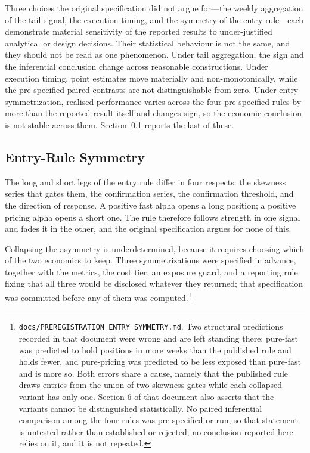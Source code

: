 \documentclass[11pt]{article}
\begin{document}
Three choices the original specification did not argue for---the weekly aggregation of the tail signal, the execution timing, and the symmetry of the entry rule---each demonstrate material sensitivity of the reported results to under-justified analytical or design decisions. Their statistical behaviour is not the same, and they should not be read as one phenomenon. Under tail aggregation, the sign and the inferential conclusion change across reasonable constructions. Under execution timing, point estimates move materially and non-monotonically, while the pre-specified paired contrasts are not distinguishable from zero. Under entry symmetrization, realised performance varies across the four pre-specified rules by more than the reported result itself and changes sign, so the economic conclusion is not stable across them. Section~\ref{sec:entrysymmetry} reports the last of these.

\subsection{Entry-Rule Symmetry}
\label{sec:entrysymmetry}

The long and short legs of the entry rule differ in four respects: the skewness series that gates them, the confirmation series, the confirmation threshold, and the direction of response. A positive fast alpha opens a long position; a positive pricing alpha opens a short one. The rule therefore follows strength in one signal and fades it in the other, and the original specification argues for none of this.

Collapsing the asymmetry is underdetermined, because it requires choosing which of the two economics to keep. Three symmetrizations were specified in advance, together with the metrics, the cost tier, an exposure guard, and a reporting rule fixing that all three would be disclosed whatever they returned; that specification was committed before any of them was computed.\footnote{\texttt{docs/PREREGISTRATION\_ENTRY\_SYMMETRY.md}. Two structural predictions recorded in that document were wrong and are left standing there: pure-fast was predicted to hold positions in more weeks than the published rule and holds fewer, and pure-pricing was predicted to be less exposed than pure-fast and is more so. Both errors share a cause, namely that the published rule draws entries from the union of two skewness gates while each collapsed variant has only one. Section 6 of that document also asserts that the variants cannot be distinguished statistically. No paired inferential comparison among the four rules was pre-specified or run, so that statement is untested rather than established or rejected; no conclusion reported here relies on it, and it is not repeated.}
\end{document}

